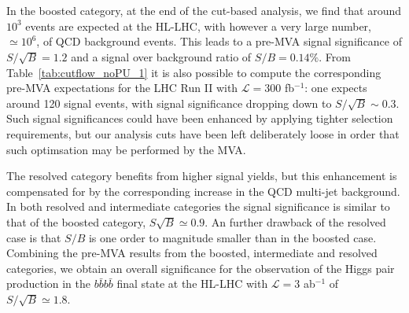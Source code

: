 \begin{table}[t]
  \centering
  \scriptsize
  
  $\,$ \\
  \vspace{0.5cm}
  
  $\,$ \\
  \vspace{0.5cm}
    
    \caption{\small The cross-sections (fb)
      for the signal and the background
      processes at different steps of the
      cut-flow, for the resolved (upper table),
      intermediate (middle table) and boosted
      (lower table) categories, for the analysis
      without PU.
      For each step, the signal over
      background ratio $S/B$, and the signal
      significance $S/\sqrt{B}$ are also provided, considering either
      the total background or just the $4b$ component. Signal
      significances are calculated for an
      integrated luminosity of $\mathcal{L}=3$ ab$^{-1}$.
      The different steps of the cut-flow are described
      in Table~\ref{tab:cutflowdetails}.
 \label{tab:cutflow_noPU_1}}
\end{table}



%
In the boosted category, at the end of the cut-based
analysis, we find that around $10^3$ events
are expected
at the HL-LHC, with however a very large number,
$\simeq 10^6$, of QCD background events.
%
This leads to a pre-MVA signal significance of
$S/\sqrt{B}=1.2$ and a signal over background
ratio of $S/B=0.14\%$.
%
From Table~\ref{tab:cutflow_noPU_1}
it is also possible to compute the corresponding pre-MVA
expectations for the LHC Run II with
$\mathcal{L}=300$ fb$^{-1}$: one expects around
120 signal events, with signal significance dropping down to
$S/\sqrt{B}\sim 0.3$.
%
Such signal
significances could have been enhanced
by applying tighter selection requirements,
but our analysis cuts have been left deliberately loose
in order that such optimsation may be performed by the MVA.


The resolved category benefits from higher signal yields,
but this enhancement is compensated for by the
corresponding
increase in the QCD multi-jet background.
%
In both resolved and intermediate categories
the signal significance is similar to that of the boosted category,
$S\sqrt{B}\simeq 0.9$.
%
An further
drawback of the resolved case is
that $S/B$
is one order to magnitude smaller than in the boosted case.
%
Combining the pre-MVA results
from the boosted, intermediate and resolved categories,
we obtain an overall
significance for the observation of the Higgs pair production
in the $b\bar{b}b\bar{b}$ final
state at the HL-LHC with $\mathcal{L}=3$ ab$^{-1}$
of  $S/\sqrt{B} \simeq 1.8$.

